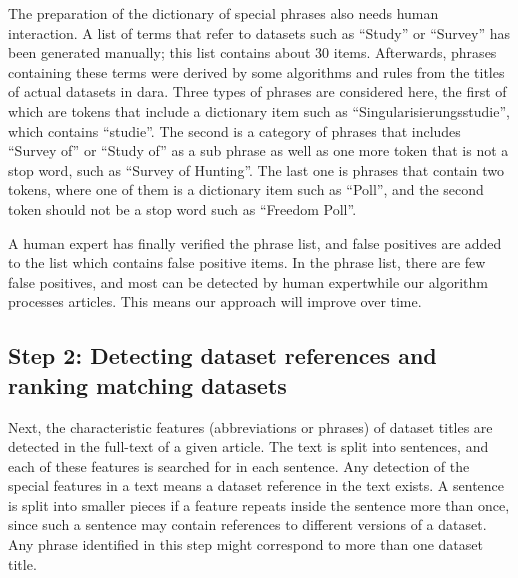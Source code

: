\documentclass{IOS-Book-Article}
\newcommand{\dara}{\textsf{da\textbar ra}}
\begin{document}
The preparation of the dictionary of special phrases also needs human interaction.
A list of terms that refer to datasets such as \enquote{Study} or \enquote{Survey} has been generated manually; this list contains about 30 items.
Afterwards, phrases containing these terms were derived by some algorithms and rules from the titles of actual datasets in {\dara}.
Three types of phrases are considered here, the first of which are tokens that include a dictionary item such as \enquote{Singularisierungsstudie}, which contains \enquote{studie}.
The second is a category of phrases that includes \enquote{Survey of} or \enquote{Study of} as a sub phrase as well as one more token that is not a stop word, such as \enquote{Survey of Hunting}.
The last one is phrases that contain two tokens, where one of them is a dictionary item such as \enquote{Poll}, and the second token should not be a stop word such as \enquote{Freedom Poll}. 

A human expert has finally verified the phrase list, and false positives are added to the list which contains false positive items.
In the phrase list, there are few false positives, and most can be detected by human expertwhile our algorithm processes articles.
This means our approach will improve over time.
 
\subsection{Step 2: Detecting dataset references and ranking matching datasets}
\label{sec:detecting-ranking}
Next, the characteristic features (abbreviations or phrases) of dataset titles are detected in the full-text of a given article.
The text is split into sentences, and each of these features is searched for in each sentence. 
Any detection of the special features in a text means a dataset reference in the text exists.
A sentence is split into smaller pieces if a feature repeats inside the sentence more than once, since such a sentence may contain references to %
different versions of a dataset.
Any phrase identified in this step might correspond to more than one dataset title.
\end{document}
